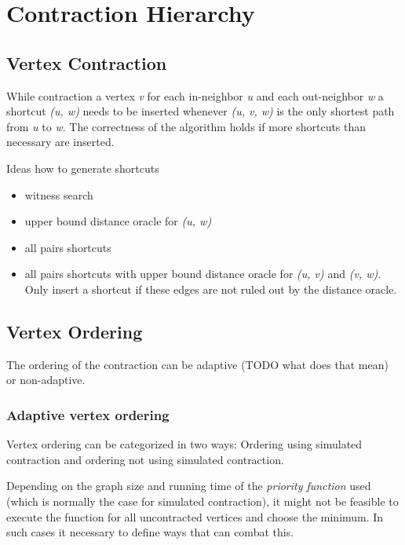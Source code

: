 \chapter{Contraction Hierarchy}

\section{Vertex Contraction}
While contraction a vertex \emph{v} for each in-neighbor \emph{u} and each out-neighbor \emph{w} a shortcut \emph{(u, w)} needs to be inserted whenever \emph{(u, v, w)} is the only shortest path from \emph{u} to \emph{w}.
The correctness of the algorithm holds if more shortcuts than necessary are inserted.

Ideas how to generate shortcuts
\begin{itemize}
      \item
            witness  search

      \item
            upper bound distance oracle for \emph{(u, w)}

      \item
            all pairs shortcuts

      \item
            all pairs shortcuts with upper bound distance oracle for \emph{(u, v)} and \emph{(v, w)}.
            Only insert a shortcut if these edges are not ruled out by the distance oracle.

\end{itemize}

\section{Vertex Ordering}
The ordering of the contraction can be adaptive (TODO what does that mean) or non-adaptive.

\subsection{Adaptive vertex ordering}
Vertex ordering can be categorized in two ways: Ordering using simulated contraction and ordering not using simulated contraction.

Depending on the graph size and running time of the \emph{priority function} used (which is normally the case for simulated contraction), it might not be feasible to execute the function for all uncontracted vertices and choose the minimum.
In such cases it necessary to define ways that can combat this.

